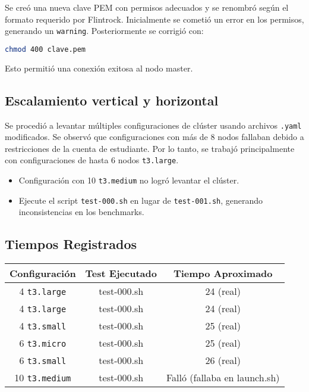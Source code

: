 \documentclass[12pt,letterpaper,twoside]{article}
\begin{document}
Se creó una nueva clave PEM con permisos adecuados y se renombró según el formato requerido por Flintrock. Inicialmente se cometió un error en los permisos, generando un \texttt{warning}. Posteriormente se corrigió con:

\begin{lstlisting}[language=bash]
chmod 400 clave.pem
\end{lstlisting}

Esto permitió una conexión exitosa al nodo master.

\subsection{Escalamiento vertical y horizontal}

Se procedió a levantar múltiples configuraciones de clúster usando archivos \texttt{.yaml} modificados. Se observó que configuraciones con más de 8 nodos fallaban debido a restricciones de la cuenta de estudiante. Por lo tanto, se trabajó principalmente con configuraciones de hasta 6 nodos \texttt{t3.large}.

\begin{itemize}
    \item Configuración con 10 \texttt{t3.medium} no logró levantar el clúster.
    \item Ejecute el script \texttt{test-000.sh} en lugar de \texttt{test-001.sh}, generando inconsistencias en los benchmarks.
\end{itemize}

\subsection*{Tiempos Registrados}

\begin{longtable}{|c|c|c|}
\hline
\textbf{Configuración} & \textbf{Test Ejecutado} & \textbf{Tiempo Aproximado} \\
\hline
4 \texttt{t3.large} & test-000.sh & 24 (real) \\
\hline
4 \texttt{t3.large} & test-000.sh & 24 (real) \\
\hline
4 \texttt{t3.small} & test-000.sh & 25 (real) \\
\hline
6 \texttt{t3.micro} & test-000.sh & 25 (real) \\
\hline
6 \texttt{t3.small} & test-000.sh & 26 (real) \\
\hline
10 \texttt{t3.medium} & test-000.sh & Falló (fallaba en launch.sh) \\
\hline
\end{longtable}
\end{document}

